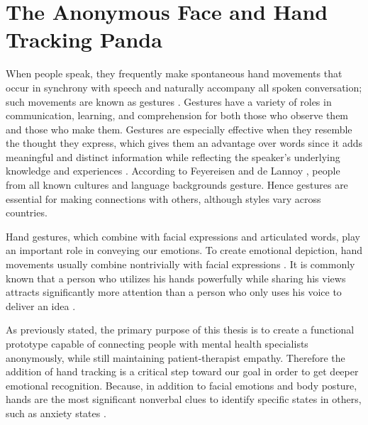 \section{The Anonymous Face and Hand Tracking Panda}

When people speak, they frequently make spontaneous hand movements that occur in synchrony with speech and naturally accompany all spoken conversation; such movements are known as gestures \cite{CLO20}. Gestures have a variety of roles in communication, learning, and comprehension for both those who observe them and those who make them. Gestures are especially effective when they resemble the thought they express, which gives them an advantage over words since it adds meaningful and distinct information while reflecting the speaker's underlying knowledge and experiences \cite{CLO20, KAN16B}. According to Feyereisen and de Lannoy \cite{FEY91}, people from all known cultures and language backgrounds gesture. Hence gestures are essential for making connections with others, although styles vary across countries.

Hand gestures, which combine with facial expressions and articulated words, play an important role in conveying our emotions. To create emotional depiction, hand movements usually combine nontrivially with facial expressions \cite{ARJ20}. It is commonly known that a person who utilizes his hands powerfully while sharing his views attracts significantly more attention than a person who only uses his voice to deliver an idea \cite{COO10, WAK18}.

As previously stated, the primary purpose of this thesis is to create a functional prototype capable of connecting people with mental health specialists anonymously, while still maintaining patient-therapist empathy. Therefore the addition of hand tracking is a critical step toward our goal in order to get deeper emotional recognition. Because, in addition to facial emotions and body posture, hands are the most significant nonverbal clues to identify specific states in others, such as anxiety states \cite{WAX97, REI22}. 

